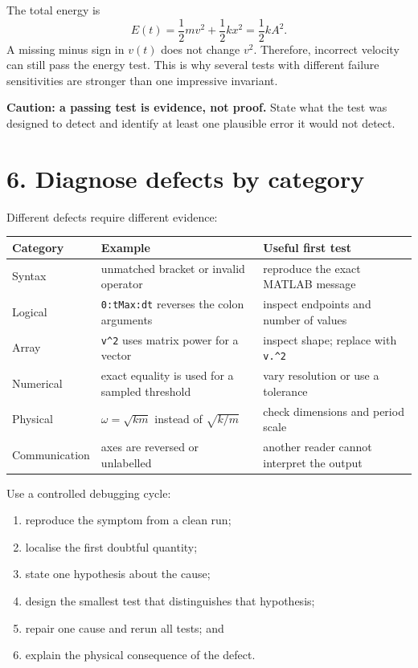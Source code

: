 \documentclass[11pt,a4paper]{article}
\begin{document}
The total energy is
\begin{equation}
 E(t)=\frac12mv^2+\frac12kx^2=\frac12kA^2.
\end{equation}
A missing minus sign in $v(t)$ does not change $v^2$. Therefore, incorrect velocity can still pass the energy test. This is why several tests with different failure sensitivities are stronger than one impressive invariant.

\begin{aibox}
\textbf{Caution: a passing test is evidence, not proof.} State what the test was designed to detect and identify at least one plausible error it would not detect.
\end{aibox}

\section*{6. Diagnose defects by category}
Different defects require different evidence:
\begin{center}
\small
\begin{tabular}{>{\raggedright\arraybackslash}p{.20\linewidth}>{\raggedright\arraybackslash}p{.34\linewidth}>{\raggedright\arraybackslash}p{.35\linewidth}}
\toprule
\textbf{Category} & \textbf{Example} & \textbf{Useful first test}\\ \midrule
Syntax & unmatched bracket or invalid operator & reproduce the exact MATLAB message\\
Logical & \texttt{0:tMax:dt} reverses the colon arguments & inspect endpoints and number of values\\
Array & \texttt{v\^{}2} uses matrix power for a vector & inspect shape; replace with \texttt{v.\^{}2}\\
Numerical & exact equality is used for a sampled threshold & vary resolution or use a tolerance\\
Physical & $\omega=\sqrt{km}$ instead of $\sqrt{k/m}$ & check dimensions and period scale\\
Communication & axes are reversed or unlabelled & another reader cannot interpret the output\\ \bottomrule
\end{tabular}
\end{center}

Use a controlled debugging cycle:
\begin{enumerate}[nosep,leftmargin=6mm]
  \item reproduce the symptom from a clean run;
  \item localise the first doubtful quantity;
  \item state one hypothesis about the cause;
  \item design the smallest test that distinguishes that hypothesis;
  \item repair one cause and rerun all tests; and
  \item explain the physical consequence of the defect.
\end{enumerate}
\end{document}
